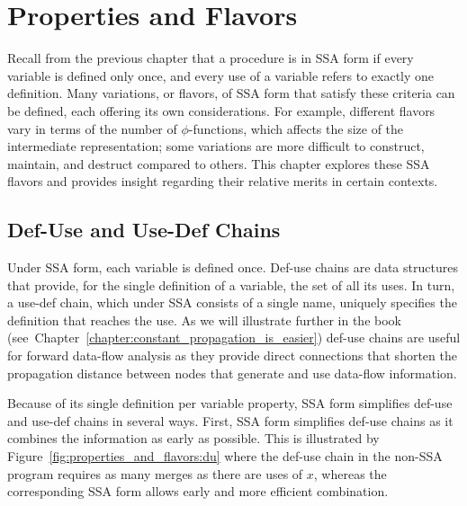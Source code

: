 \chapter{Properties and Flavors }
\label{chapter:properties_and_flavours}




Recall from the previous chapter that a procedure is in SSA form if every variable is defined only once, and every use of a variable refers to exactly one definition. 
Many variations, or flavors, of SSA form that satisfy these criteria can be defined, each offering its own considerations. 
For example, different flavors vary in terms of the number of $\phi$-functions, which affects the size of the intermediate representation; 
some variations are more difficult to construct, maintain, and destruct compared to others. 
This chapter explores these SSA flavors and provides insight regarding their relative merits in certain contexts.

\section{Def-Use and Use-Def Chains}
\label{sec:properties_and_flavours:def-use}
Under SSA form, each variable is defined once. 
Def-use chains are data structures that provide, for the single definition of a variable, the set of all its uses. 
In turn, a use-def chain, which under SSA consists of a single name, uniquely specifies the definition that reaches the use. 
As we will illustrate further in the book (see~Chapter~\ref{chapter:constant_propagation_is_easier}) def-use chains are useful for forward data-flow analysis as they provide direct connections that shorten the propagation distance between nodes that generate and use data-flow information.

Because of its single definition per variable property, SSA form simplifies def-use and use-def chains in several ways. 
First, SSA form simplifies def-use chains as it combines the information as early as possible. 
This is illustrated by Figure~\ref{fig:properties_and_flavors:du} where the def-use chain in the non-SSA program requires as many merges as there are uses of $x$, whereas the corresponding SSA form allows early and more efficient combination.

